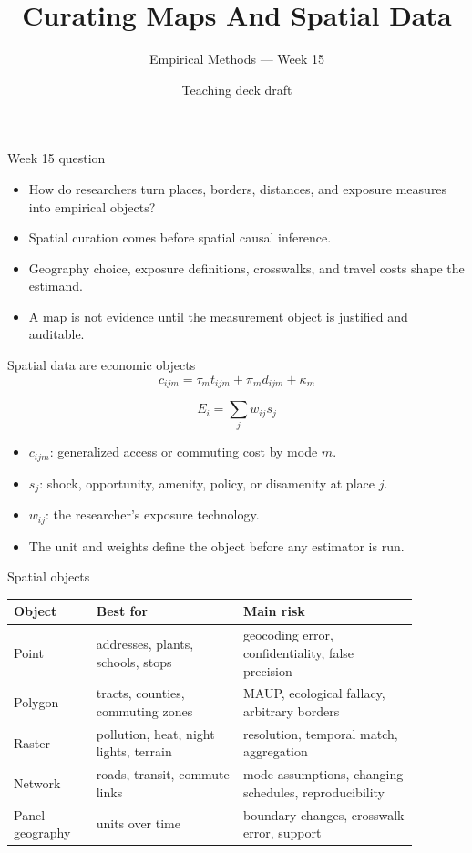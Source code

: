 \documentclass[aspectratio=169,11pt]{beamer}
\title{Curating Maps And Spatial Data}
\subtitle{Empirical Methods --- Week 15}
\author{Teaching deck draft}
\date{}
\newcommand{\1}{\mathbf{1}}
\begin{document}
\begin{frame}
  \titlepage
\end{frame}

\begin{frame}{Week 15 question}
\begin{itemize}
    \item How do researchers turn places, borders, distances, and exposure measures into empirical objects?
    \item Spatial curation comes before spatial causal inference.
    \item Geography choice, exposure definitions, crosswalks, and travel costs shape the estimand.
    \item A map is not evidence until the measurement object is justified and auditable.
\end{itemize}
\end{frame}

\begin{frame}{Spatial data are economic objects}
\small
\[
c_{ijm}=\tau_m t_{ijm}+\pi_m d_{ijm}+\kappa_m
\]

\[
E_i=\sum_j w_{ij}s_j
\]

\begin{itemize}
    \item \(c_{ijm}\): generalized access or commuting cost by mode \(m\).
    \item \(s_j\): shock, opportunity, amenity, policy, or disamenity at place \(j\).
    \item \(w_{ij}\): the researcher's exposure technology.
    \item The unit and weights define the object before any estimator is run.
\end{itemize}
\end{frame}

\begin{frame}{Spatial objects}
\small
\begin{tabular}{p{0.18\linewidth} p{0.32\linewidth} p{0.38\linewidth}}
\toprule
Object & Best for & Main risk \\
\midrule
Point & addresses, plants, schools, stops & geocoding error, confidentiality, false precision \\
Polygon & tracts, counties, commuting zones & MAUP, ecological fallacy, arbitrary borders \\
Raster & pollution, heat, night lights, terrain & resolution, temporal match, aggregation \\
Network & roads, transit, commute links & mode assumptions, changing schedules, reproducibility \\
Panel geography & units over time & boundary changes, crosswalk error, support \\
\bottomrule
\end{tabular}
\end{frame}
\end{document}
